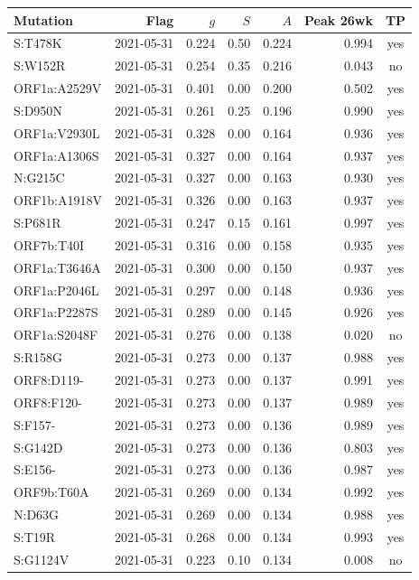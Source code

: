 \begin{longtable}{lrrrrrc}
\toprule Mutation & Flag & $g$ & $S$ & $A$ & Peak 26wk & TP\\\midrule
\endhead
S:T478K & 2021-05-31 & 0.224 & 0.50 & 0.224 & 0.994 & yes\\
S:W152R & 2021-05-31 & 0.254 & 0.35 & 0.216 & 0.043 & no\\
ORF1a:A2529V & 2021-05-31 & 0.401 & 0.00 & 0.200 & 0.502 & yes\\
S:D950N & 2021-05-31 & 0.261 & 0.25 & 0.196 & 0.990 & yes\\
ORF1a:V2930L & 2021-05-31 & 0.328 & 0.00 & 0.164 & 0.936 & yes\\
ORF1a:A1306S & 2021-05-31 & 0.327 & 0.00 & 0.164 & 0.937 & yes\\
N:G215C & 2021-05-31 & 0.327 & 0.00 & 0.163 & 0.930 & yes\\
ORF1b:A1918V & 2021-05-31 & 0.326 & 0.00 & 0.163 & 0.937 & yes\\
S:P681R & 2021-05-31 & 0.247 & 0.15 & 0.161 & 0.997 & yes\\
ORF7b:T40I & 2021-05-31 & 0.316 & 0.00 & 0.158 & 0.935 & yes\\
ORF1a:T3646A & 2021-05-31 & 0.300 & 0.00 & 0.150 & 0.937 & yes\\
ORF1a:P2046L & 2021-05-31 & 0.297 & 0.00 & 0.148 & 0.936 & yes\\
ORF1a:P2287S & 2021-05-31 & 0.289 & 0.00 & 0.145 & 0.926 & yes\\
ORF1a:S2048F & 2021-05-31 & 0.276 & 0.00 & 0.138 & 0.020 & no\\
S:R158G & 2021-05-31 & 0.273 & 0.00 & 0.137 & 0.988 & yes\\
ORF8:D119- & 2021-05-31 & 0.273 & 0.00 & 0.137 & 0.991 & yes\\
ORF8:F120- & 2021-05-31 & 0.273 & 0.00 & 0.137 & 0.989 & yes\\
S:F157- & 2021-05-31 & 0.273 & 0.00 & 0.136 & 0.989 & yes\\
S:G142D & 2021-05-31 & 0.273 & 0.00 & 0.136 & 0.803 & yes\\
S:E156- & 2021-05-31 & 0.273 & 0.00 & 0.136 & 0.987 & yes\\
ORF9b:T60A & 2021-05-31 & 0.269 & 0.00 & 0.134 & 0.992 & yes\\
N:D63G & 2021-05-31 & 0.269 & 0.00 & 0.134 & 0.988 & yes\\
S:T19R & 2021-05-31 & 0.268 & 0.00 & 0.134 & 0.993 & yes\\
S:G1124V & 2021-05-31 & 0.223 & 0.10 & 0.134 & 0.008 & no\\

\end{longtable}

